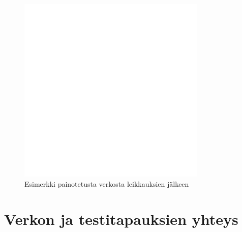   \begin{figure}[H]
    \centering
    \includegraphics[width=0.8\textwidth]{assets/painotetun-verkon-esimerkki-jalkeen.png}
    \caption{Esimerkki painotetusta verkosta leikkauksien jälkeen}
    \label{fig:painotetun-verkon-esimerkki-jalkeen}
  \end{figure}

\section{Verkon ja testitapauksien yhteys} \label{ch:10_verkon_ja_testitapauksien_yhteys}

